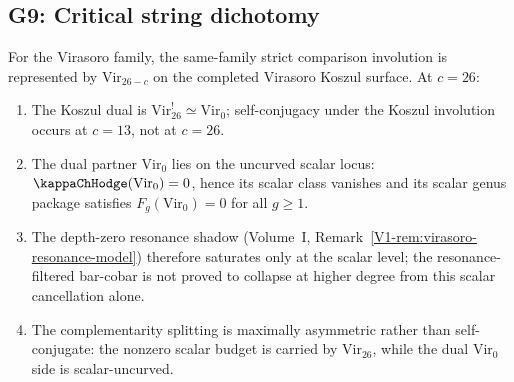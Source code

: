 \subsection{G9: Critical string dichotomy}

\begin{theorem}
For the Virasoro family, the same-family strict comparison involution
is represented by $\mathrm{Vir}_{26-c}$ on the completed Virasoro
Koszul surface. At $c = 26$:
\begin{enumerate}[label=\textup{(\roman*)}]
\item The Koszul dual is
 $\mathrm{Vir}_{26}^! \simeq \mathrm{Vir}_0$; self-conjugacy under the
 Koszul involution occurs at $c = 13$, not at $c = 26$.
\item The dual partner $\mathrm{Vir}_0$ lies on the uncurved scalar
 locus: $\kappaChHodge(\mathrm{Vir}_0) = 0$, hence its scalar class vanishes
 and its scalar genus package satisfies
 $F_g(\mathrm{Vir}_0) = 0$ for all $g \geq 1$.
\item The depth-zero resonance shadow
 (Volume~I, Remark~\ref{V1-rem:virasoro-resonance-model}) therefore
 saturates only at the scalar level; the resonance-filtered bar-cobar
 is not proved to collapse at higher degree from this scalar
 cancellation alone.
\item The complementarity splitting is maximally asymmetric rather than
 self-conjugate: the nonzero scalar budget is carried by
 $\mathrm{Vir}_{26}$, while the dual $\mathrm{Vir}_0$ side is
 scalar-uncurved.
\end{enumerate}
\end{theorem}

